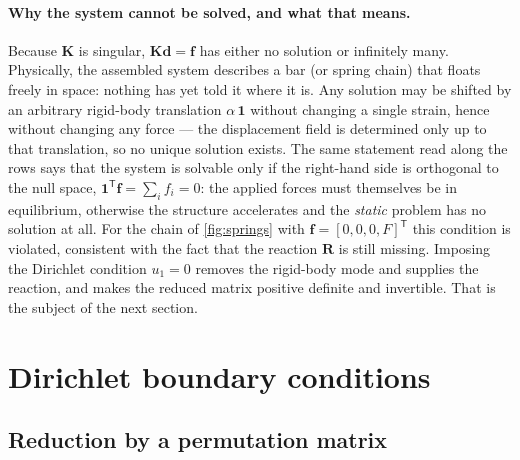 \documentclass[11pt,a4paper]{article}
\numberwithin{equation}{section}
\theoremstyle{remark}
\newcommand{\bK}{\bm{K}}
\newcommand{\bR}{\bm{R}}
\newcommand{\bd}{\bm{d}}
\newcommand{\bff}{\bm{f}}
\begin{document}
\paragraph{Why the system cannot be solved, and what that means.}
Because $\bK$ is singular, $\bK\bd = \bff$ has either no solution or infinitely many.
Physically, the assembled system describes a bar (or spring chain) that floats freely in
space: nothing has yet told it where it is. Any solution may be shifted by an arbitrary
rigid-body translation $\alpha\,\bm{1}$ without changing a single strain, hence without
changing any force --- the displacement field is determined only up to that translation, so
no unique solution exists. The same statement read along the rows says that the system is
solvable only if the right-hand side is orthogonal to the null space,
$\bm{1}^{\mathsf{T}}\bff = \sum_i f_i = 0$: the applied forces must themselves be in
equilibrium, otherwise the structure accelerates and the \emph{static} problem has no
solution at all. For the chain of \cref{fig:springs} with $\bff = [0,0,0,F]^{\mathsf{T}}$
this condition is violated, consistent with the fact that the reaction $\bR$ is still
missing. Imposing the Dirichlet condition $u_1 = 0$ removes the rigid-body mode and
supplies the reaction, and makes the reduced matrix positive definite and invertible. That
is the subject of the next section.

\section{Dirichlet boundary conditions}\label{sec:dirichlet}

\subsection{Reduction by a permutation matrix}\label{sec:reduction}
\end{document}
